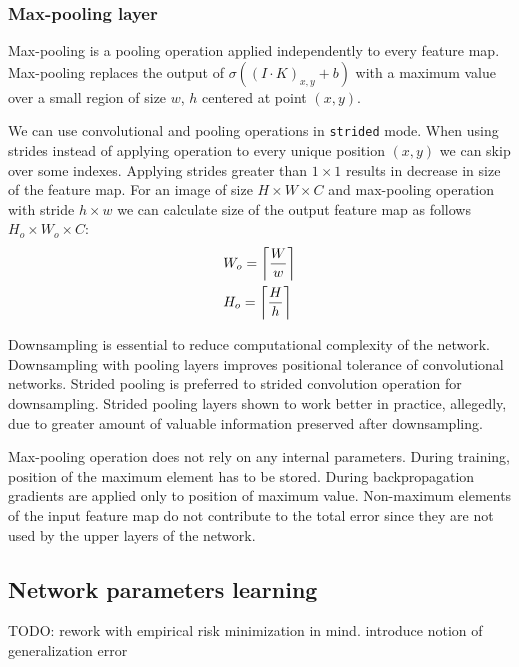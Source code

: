 \subsubsection{Max-pooling layer}

Max-pooling is a pooling operation applied independently to every feature map.
Max-pooling replaces the output of $\sigma((I \cdot K)_{x, y}+b)$ with a maximum value over a small region of size $w$, $h$ centered at point $(x,y)$.

We can use convolutional and pooling operations in \texttt{strided} mode. When using strides instead of applying operation to every unique position $(x, y)$ we can skip over some indexes. Applying strides greater than $1 \times 1$ results in decrease in size of the feature map. For an image of size $H \times W \times C$ and max-pooling operation with stride $h \times w$ we can calculate size of the output feature map as follows $H_o \times W_o \times C $:
\begin{equation*}
  \begin{aligned}
  & W_o = \ceil[\bigg]{\frac{W}{w}} \\
  & H_o = \ceil[\bigg]{\frac{H}{h}} \\
\end{aligned}
\end{equation*}

Downsampling is essential to reduce computational complexity of the network.
Downsampling with pooling layers improves positional tolerance of convolutional networks.
Strided pooling is preferred to strided convolution operation for downsampling. Strided pooling layers shown to work better in practice, allegedly, due to greater amount of valuable information preserved after downsampling.

Max-pooling operation does not rely on any internal parameters. During training, position of the maximum element has to be stored. During backpropagation gradients are applied only to position of maximum value. Non-maximum elements of the input feature map do not contribute to the total error since they are not used by the upper layers of the network.

\subsection{Network parameters learning}
\label{ch:opt}

TODO: rework with empirical risk minimization in mind. introduce notion of generalization error

